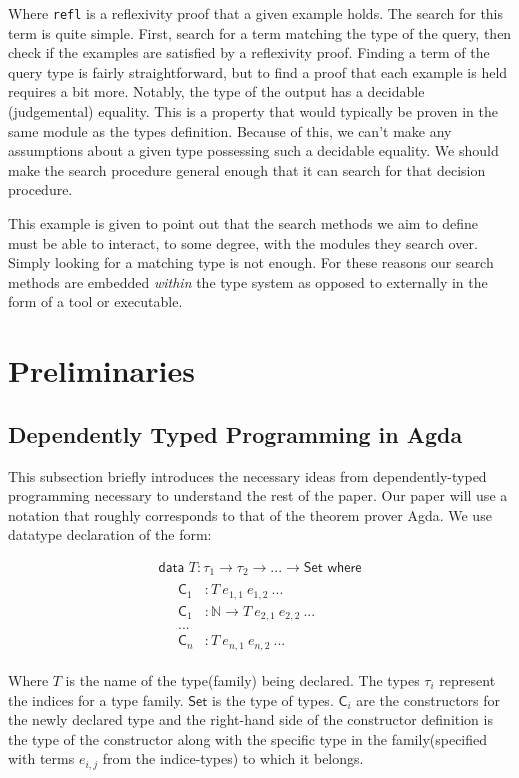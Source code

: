 \documentclass[acmsmall,review,authorversion]{acmart}
\newcommand{\type}[1]{\textsf{#1}}
\newcommand{\Set}{\type{Set}}
\newcommand{\?}{\stackrel{?}{\approx}}
\newcommand{\data}[2]{\textsf{data } #1 : #2 \textsf{ where}}
\newcommand{\ra}{\rightarrow}
\begin{document}
Where \texttt{refl} is a reflexivity proof that a given example holds. The
search for this term is quite simple. First, search for a term matching the type
of the query, then check if the examples are satisfied by a reflexivity proof.
Finding a term of the query type is fairly straightforward, but to find a proof
that each example is held requires a bit more. Notably, the type of the output
has a decidable (judgemental) equality. This is a property that would typically
be proven in the same module as the types definition. Because of this, we can't
make any assumptions about a given type possessing such a decidable equality. We
should make the search procedure general enough that it can search for that
decision procedure.

This example is given to point out that the search methods we aim to define must
be able to interact, to some degree, with the modules they search over. Simply
looking for a matching type is not enough. For these reasons our search methods
are embedded \textit{within} the type system as opposed to externally in the
form of a tool or executable.


\section{Preliminaries}

\subsection{Dependently Typed Programming in Agda}

This subsection briefly introduces the necessary ideas from dependently-typed
programming necessary to understand the rest of the paper. Our paper will use
a notation that roughly corresponds to that of the theorem prover Agda. We use
datatype declaration of the form:

$$
\begin{array}{l}
\data{T}{\tau_1 \ra \tau_2 \ra ... \ra \Set}\\
\quad \begin{array}{rl}
  \textsf{C}_1 & : T\ e_{1,1}\ e_{1,2}\ ...\\
  \textsf{C}_1 & : \mathbb{N} \ra T\ e_{2,1}\ e_{2,2}\ ...\\
        ... &\\
  \textsf{C}_n & : T\ e_{n,1}\ e_{n,2}\ ...
\end{array}
\end{array}
$$

Where $T$ is the name of the type(family) being declared. The types $\tau_i$
represent the indices for a type family. $\Set$ is the type of types.
$\textsf{C}_i$ are the constructors for the newly declared type and the
right-hand side of the constructor definition is the type of the constructor
along with the specific type in the family(specified with terms $e_{i,j}$ from
the indice-types) to which it belongs.
\end{document}
